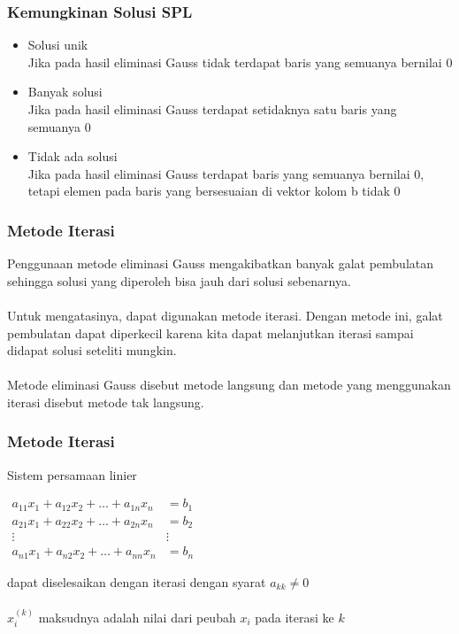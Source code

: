 \documentclass{beamer}
\begin{document}

\begin{frame}
\frametitle{Kemungkinan Solusi SPL}
\begin{itemize}
\item Solusi unik
\\Jika pada hasil eliminasi Gauss tidak terdapat baris yang semuanya bernilai 0
\item Banyak solusi
\\Jika pada hasil eliminasi Gauss terdapat setidaknya satu baris yang semuanya 0
\item Tidak ada solusi
\\Jika pada hasil eliminasi Gauss terdapat baris yang semuanya bernilai 0, tetapi elemen pada baris yang bersesuaian di vektor kolom b tidak 0
\end{itemize}
\end{frame}



\begin{frame}
\frametitle{Metode Iterasi}
Penggunaan metode eliminasi Gauss mengakibatkan banyak galat pembulatan sehingga solusi yang diperoleh bisa jauh dari solusi sebenarnya.
\\\ \\Untuk mengatasinya, dapat digunakan metode iterasi. Dengan metode ini, galat pembulatan dapat diperkecil karena kita dapat melanjutkan iterasi sampai didapat solusi seteliti mungkin.
\\\ \\Metode eliminasi Gauss disebut metode langsung dan metode yang menggunakan iterasi disebut metode tak langsung.
\end{frame}


\begin{frame}
\frametitle{Metode Iterasi}
Sistem persamaan linier 
\begin{center}
$\begin{matrix}
	a_{11}x_1+a_{12}x_2+\dots + a_{1n}x_n & =b_1\\
	a_{21}x_1+a_{22}x_2+\dots + a_{2n}x_n & =b_2\\
	\vdots & \vdots \\
	a_{n1}x_1+a_{n2}x_2+\dots + a_{nn}x_n & =b_n
\end{matrix}$
\end{center}
dapat diselesaikan dengan iterasi dengan syarat $a_{kk}\neq 0$
\\\ \\$x_i^{(k)}$ maksudnya adalah nilai dari peubah $x_i$ pada iterasi ke $k$
\end{frame}
\end{document}
